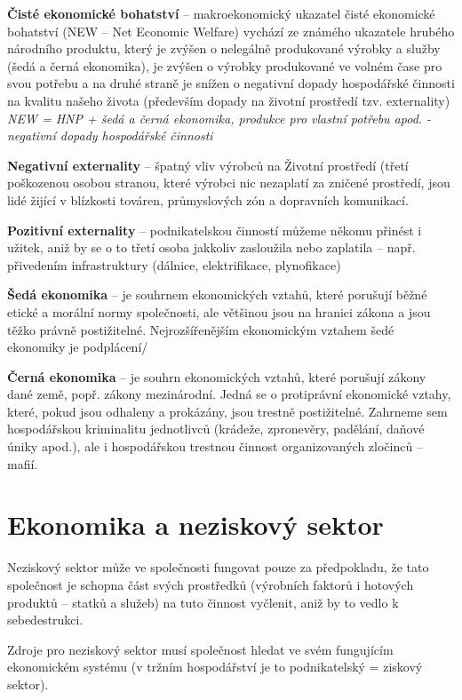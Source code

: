\textbf{Čisté ekonomické bohatství} -- makroekonomický ukazatel čisté ekonomické bohatství (NEW -- Net Economic Welfare) vychází ze známého ukazatele hrubého národního produktu, který je zvýšen o nelegálně produkované výrobky a služby (šedá a černá ekonomika), je zvýšen o výrobky produkované ve volném čase pro svou potřebu a na druhé straně je snížen o negativní dopady hospodářské činnosti na kvalitu našeho života (především dopady na životní prostředí tzv. externality) \\
\textit{NEW = HNP + šedá a černá ekonomika, produkce pro vlastní potřebu apod. - negativní dopady hospodářské činnosti}

\textbf{Negativní externality} -- špatný vliv výrobců na Životní prostředí (třetí poškozenou osobou stranou, které výrobci nic nezaplatí za zničené prostředí, jsou lidé žijící v blízkosti továren, průmyslových zón a dopravních komunikací.

\textbf{Pozitivní externality} -- podnikatelskou činností můžeme někomu přinést i užitek, aniž by se o to třetí osoba jakkoliv zasloužila nebo zaplatila -- např. přivedením infrastruktury (dálnice, elektrifikace, plynofikace)

\textbf{Šedá ekonomika} -- je souhrnem ekonomických vztahů, které porušují běžné etické a morální normy společnosti, ale většinou jsou na hranici zákona a jsou těžko právně postižitelné. Nejrozšířenějším ekonomickým vztahem šedé ekonomiky je podplácení/

\textbf{Černá ekonomika} -- je souhrn ekonomických vztahů, které porušují zákony dané země, popř. zákony mezinárodní. Jedná se o protiprávní ekonomické vztahy, které, pokud jsou odhaleny a prokázány, jsou trestně postižitelné. Zahrneme sem hospodářskou kriminalitu jednotlivců (krádeže, zpronevěry, padělání, daňové úniky apod.), ale i hospodářskou trestnou činnost organizovaných zločinců -- mafií.

\section*{Ekonomika a neziskový sektor}

Neziskový sektor může ve společnosti fungovat pouze za předpokladu, že tato společnost je schopna část svých prostředků (výrobních faktorů i hotových produktů -- statků a služeb) na tuto činnost vyčlenit, aniž by to vedlo k sebedestrukci.

Zdroje pro neziskový sektor musí společnost hledat ve svém fungujícím ekonomickém systému (v tržním hospodářství je to podnikatelský = ziskový sektor).

